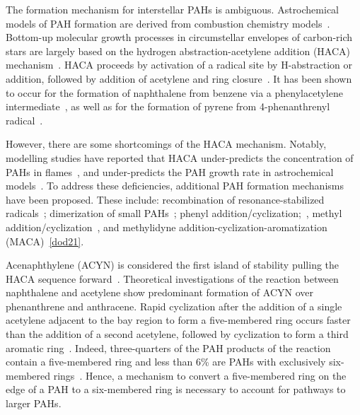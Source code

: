 \documentclass[journal=jacsat,manuscript=article,layout=onecolumn]{achemso}
\begin{document}

The formation mechanism for interstellar PAHs is ambiguous. Astrochemical models of PAH formation are derived from combustion chemistry models~\cite{fre89}. Bottom-up molecular growth processes in circumstellar envelopes of carbon-rich stars are largely based on the hydrogen abstraction-acetylene addition (HACA) mechanism~\cite{tie13}. HACA proceeds by activation of a radical site by H-abstraction or addition, followed by addition of acetylene and ring closure~\cite{fre85}.  It has been shown to occur for the formation of naphthalene from benzene via a phenylacetylene intermediate~\cite{par14,yan16}, as well as for the formation of pyrene from 4-phenanthrenyl radical~\cite{zha18}.

However, there are some shortcomings of the HACA mechanism. Notably, modelling studies have reported that HACA under-predicts the concentration of PAHs in flames~\cite{raj12}, and under-predicts the PAH growth rate in astrochemical models~\cite{mic10a,mic10b,mic11}. To address these deficiencies, additional PAH formation mechanisms have been proposed. These include: recombination of resonance-stabilized radicals~\cite{mel96,mil92,joh18}; dimerization of small PAHs~\cite{sie00}; phenyl addition/cyclization;~\cite{shu08}, methyl addition/cyclization~\cite{shu10}, and methylidyne addition-cyclization-aromatization (MACA)~\ref{dod21}. %

Acenaphthylene (ACYN) is considered the first island of stability pulling the HACA sequence forward~\cite{fre20}. Theoretical investigations of the reaction between naphthalene and acetylene show predominant formation of ACYN over phenanthrene and anthracene. Rapid cyclization after the addition of a single acetylene adjacent to the bay region to form a five-membered ring occurs faster than the addition of a second acetylene, followed by cyclization to form a third aromatic ring~\cite{kis13}. Indeed, three-quarters of the PAH products of the reaction contain a five-membered ring and less than 6\% are PAHs with exclusively six-membered rings~\cite{kis13}. Hence, a mechanism to convert a five-membered ring on the edge of a PAH to a six-membered ring is necessary to account for pathways to larger PAHs. %
\end{document}
